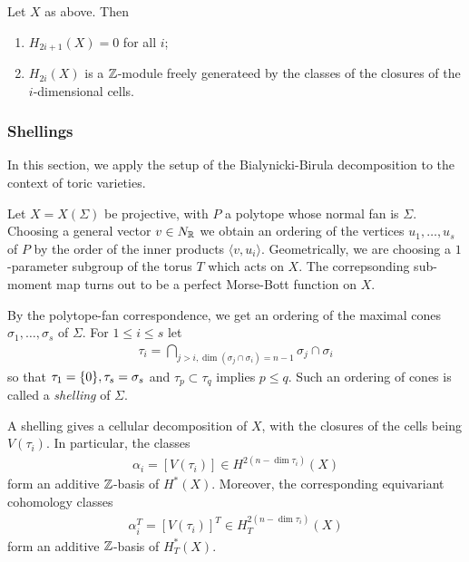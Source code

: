 \begin{cor}
    Let $X$ as above. Then \begin{enumerate}
        \item $H_{2i+1}(X) = 0$ for all $i$;
        \item $H_{2i}(X)$ is a $\mathbb{Z}$-module freely generateed by the classes
        of the closures of the $i$-dimensional cells.
    \end{enumerate}
\end{cor}

\subsubsection{Shellings}
In this section, we apply the setup 
of the Bialynicki-Birula decomposition to the context of toric varieties.

\hfill

Let $X = X(\Sigma)$ be projective, with $P$ 
a polytope whose normal fan is $\Sigma$. Choosing
a general vector $v\in N_{\mathbb{R}}$ we obtain an ordering of the vertices 
$u_1,\ldots,u_s$ of $P$ by the order of the inner products $\langle v,u_i\rangle$.
Geometrically, we are choosing a $1$-parameter subgroup of the torus $T$ 
which acts on $X$. The correpsonding sub-moment map turns out to be
a perfect Morse-Bott function on $X$.

\hfill

By the polytope-fan correspondence,
we get an ordering of the maximal cones $\sigma_1,\ldots,\sigma_s$ of $\Sigma$.
For $1\leq i \leq s$ let \begin{align*}
    \tau_i = \bigcap_{j>i, \dim(\sigma_j \cap \sigma_i) = n-1} \sigma_j \cap \sigma_i
\end{align*} so that 
$\tau_1 = \{0\}, \tau_s = \sigma_s$ and $\tau_p \subset \tau_q$
implies $p \leq q$. Such an ordering of cones 
is called a \emph{shelling} of $\Sigma$. 

\begin{proposition}
    A shelling gives a cellular decomposition of $X$, with
the closures of the cells being $V(\tau_i)$. In particular,
the classes \begin{align*}
    \alpha_i = [V(\tau_i)] \in H^{2(n-\dim \tau_i)}(X)
\end{align*}
form an additive $\mathbb{Z}$-basis of $H^*(X)$. Moreover, the 
corresponding equivariant cohomology classes \begin{align*}
	\alpha_i^T = [V(\tau_i)]^T \in H^{2(n-\dim \tau_i)}_T(X)
\end{align*} form an additive $\mathbb{Z}$-basis of $H^*_T(X)$.
\end{proposition}


